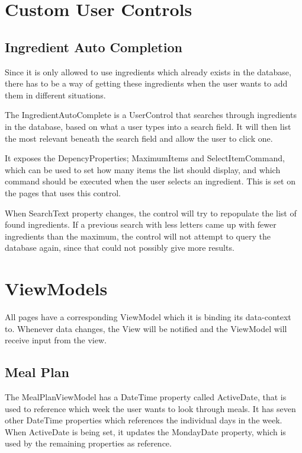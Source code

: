 \chapter{Custom User Controls}

\section{Ingredient Auto Completion} \label{sec:AutoComplete}
Since it is only allowed to use ingredients which already exists in the database, there has to be a way of getting these ingredients when the user wants to add them in different situations.

The IngredientAutoComplete is a UserControl that searches through ingredients in the database, based on what a user types into a search field. It will then list the most relevant beneath the search field and allow the user to click one.

It exposes the DepencyProperties; MaximumItems and SelectItemCommand, which can be used to set how many items the list should display, and which command should be executed when the user selects an ingredient. This is set on the pages that uses this control.

When SearchText property changes, the control will try to repopulate the list of found ingredients. If a previous search with less letters came up with fewer ingredients than the maximum, the control will not attempt to query the database again, since that could not possibly give more results.

\chapter{ViewModels}
All pages have a corresponding ViewModel which it is binding its data-context to. Whenever data changes, the View will be notified and the ViewModel will receive input from the view.

\section{Meal Plan}

The MealPlanViewModel has a DateTime property called ActiveDate, that is used to reference which week the user wants to look through meals. It has seven other DateTime properties which references the individual days in the week. When ActiveDate is being set, it updates the MondayDate property, which is used by the remaining properties as reference.

